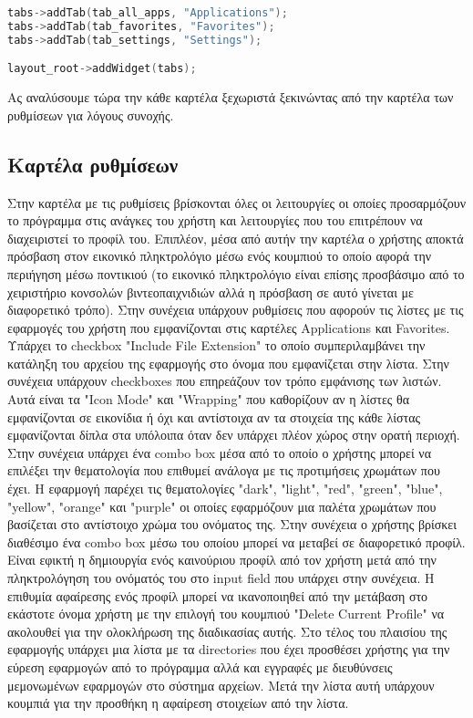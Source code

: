 \begin{lstlisting}[language=C++, style=cppstyle]
tabs->addTab(tab_all_apps, "Applications");
tabs->addTab(tab_favorites, "Favorites");
tabs->addTab(tab_settings, "Settings");

layout_root->addWidget(tabs);
\end{lstlisting}

Ας αναλύσουμε τώρα την κάθε καρτέλα ξεχωριστά ξεκινώντας από την καρτέλα των ρυθμίσεων για
λόγους συνοχής.



\subsection{Καρτέλα ρυθμίσεων}

Στην καρτέλα με τις ρυθμίσεις βρίσκονται όλες οι λειτουργίες οι οποίες προσαρμόζουν το
πρόγραμμα στις ανάγκες του χρήστη και λειτουργίες που του επιτρέπουν να διαχειριστεί το
προφίλ του. Επιπλέον, μέσα από αυτήν την καρτέλα ο χρήστης αποκτά πρόσβαση στον εικονικό
πληκτρολόγιο μέσω ενός κουμπιού το οποίο αφορά την περιήγηση μέσω ποντικιού (το εικονικό
πληκτρολόγιο είναι επίσης προσβάσιμο από το χειριστήριο κονσολών βιντεοπαιχνιδιών αλλά η
πρόσβαση σε αυτό γίνεται με διαφορετικό τρόπο). Στην συνέχεια υπάρχουν ρυθμίσεις που αφορούν
τις λίστες με τις εφαρμογές του χρήστη που εμφανίζονται στις καρτέλες Applications και 
Favorites. Υπάρχει το checkbox "Include File Extension" το οποίο συμπεριλαμβάνει την κατάληξη
του αρχείου της εφαρμογής στο όνομα που εμφανίζεται στην λίστα. Στην συνέχεια υπάρχουν
checkboxes που επηρεάζουν τον τρόπο εμφάνισης των λιστών. Αυτά είναι τα "Icon Mode" και
"Wrapping" που καθορίζουν αν η λίστες θα εμφανίζονται σε εικονίδια ή όχι και αντίστοιχα αν τα στοιχεία
της κάθε λίστας εμφανίζονται δίπλα στα υπόλοιπα όταν δεν υπάρχει πλέον χώρος στην ορατή περιοχή.
Στην συνέχεια υπάρχει ένα combo box μέσα από το οποίο ο χρήστης μπορεί να επιλέξει την
θεματολογία που επιθυμεί ανάλογα με τις προτιμήσεις χρωμάτων που έχει. Η εφαρμογή παρέχει τις
θεματολογίες "dark", "light", "red", "green", "blue", "yellow", "orange" και "purple" οι οποίες
εφαρμόζουν μια παλέτα χρωμάτων που βασίζεται στο αντίστοιχο χρώμα του ονόματος της. Στην συνέχεια
ο χρήστης βρίσκει διαθέσιμο ένα combo box μέσω του οποίου μπορεί να μεταβεί σε διαφορετικό προφίλ.
Είναι εφικτή η δημιουργία ενός καινούριου προφίλ από τον χρήστη μετά από την πληκτρολόγηση του
ονόματός του στο input field που υπάρχει στην συνέχεια. Η επιθυμία αφαίρεσης ενός προφίλ μπορεί να
ικανοποιηθεί από την μετάβαση στο εκάστοτε όνομα χρήστη με την επιλογή του κουμπιού
"Delete Current Profile" να ακολουθεί για την ολοκλήρωση της διαδικασίας αυτής. Στο τέλος του πλαισίου
της εφαρμογής υπάρχει μια λίστα με τα directories που έχει προσθέσει χρήστης για την εύρεση εφαρμογών 
από το πρόγραμμα αλλά και εγγραφές με διευθύνσεις μεμονωμένων εφαρμογών στο σύστημα αρχείων.
Μετά την λίστα αυτή υπάρχουν κουμπιά για την προσθήκη η αφαίρεση στοιχείων από την λίστα.



